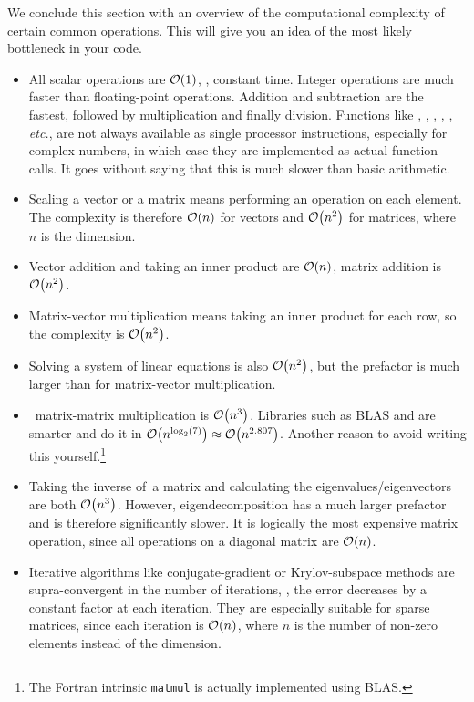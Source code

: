We conclude this section with an overview of the computational complexity of certain common operations.
This will give you an idea of the most likely bottleneck in your code.
\begin{itemize}
  \item All scalar operations are $\mathcal{O}\!\left(1\right)$, \ie, constant time.
    Integer operations are much faster than floating-point operations.
    Addition and subtraction are the fastest, followed by multiplication and finally division.
    Functions like , , , , , \emph{etc.}, are not always available as single processor instructions, especially for complex numbers, in which case they are implemented as actual function calls.
    It goes without saying that this is much slower than basic arithmetic.
  \item Scaling a vector or a matrix means performing an operation on each element.
    The complexity is therefore $\mathcal{O}\!\left(n\right)$ for vectors and $\mathcal{O}\!\left(n^2\right)$ for matrices, where $n$ is the dimension.
  \item Vector addition and taking an inner product are $\mathcal{O}\!\left(n\right)$, matrix addition is $\mathcal{O}\!\left(n^2\right)$.
  \item Matrix-vector multiplication means taking an inner product for each row, so the complexity is $\mathcal{O}\!\left(n^2\right)$.
  \item Solving a system of linear equations is also $\mathcal{O}\!\left(n^2\right)$, but the prefactor is much larger than for matrix-vector multiplication.
  \item \Naive\ matrix-matrix multiplication is $\mathcal{O}\!\left(n^3\right)$.
    Libraries such as BLAS and  are smarter and do it in $\mathcal{O}\!\left(n^{\log_2(7)}\right)\approx\mathcal{O}\!\left(n^{2.807}\right)$.
    Another reason to avoid writing this yourself.\footnote{The Fortran intrinsic \texttt{matmul} is actually implemented using BLAS.}
  \item Taking the inverse of\ a matrix and calculating the eigenvalues/eigenvectors are both $\mathcal{O}\!\left(n^3\right)$.
    However, eigendecomposition has a much larger prefactor and is therefore significantly slower.
    It is logically the most expensive matrix operation, since all operations on a diagonal matrix are $\mathcal{O}\!\left(n\right)$.
  \item Iterative algorithms like conjugate-gradient or Krylov-subspace methods are supra-\linebreak convergent in the number of iterations, \ie, the error decreases by a constant factor at each iteration.
    They are especially suitable for sparse matrices, since each iteration is $\mathcal{O}\!\left(n\right)$, where $n$ is the number of non-zero elements instead of the dimension.
\end{itemize}


